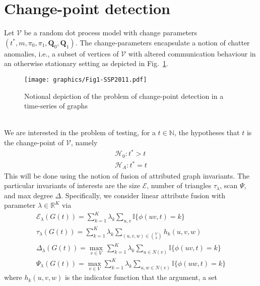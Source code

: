 \documentclass[draftcls]{IEEEtran}
\theoremstyle{definition}
\begin{document}
\section{Change-point detection}
Let $\mathscr{V}$ be a random dot process model with change parameters
$(t^{*}, m, \pi_0, \pi_1, \mathbf{Q}_0, \mathbf{Q}_1)$. The
change-parameters encapsulate a notion of chatter anomalies, i.e., a
subset of vertices of $\mathscr{V}$ with altered communication
behaviour in an otherwise stationary setting as depicted in Fig.~\ref{fig:notional_change_point}. 
\begin{figure}[htbp]
  \centering
  \texttt{[image: graphics/Fig1-SSP2011.pdf]}
  \caption{Notional depiction of the problem of change-point detection in a time-series of graphs}
  \label{fig:notional_change_point}
\end{figure}
\\ \noindent
We are interested in
the problem of testing, for a $t \in \mathbb{N}$, the hypotheses that
$t$ is the change-point of $\mathscr{V}$, namely
\begin{gather*}
  \mathscr{H}_0 \colon t^{*} > t \\
  \mathscr{H}_A \colon t^{*} = t
\end{gather*}
This will be done using the notion of fusion of attributed graph
invariants. The particular invariants of interests are the size
$\mathcal{E}$, number of triangles $\tau_{\lambda}$, scan $\Psi$, and
max degree $\Delta$. Specifically, we consider linear attribute
fusion with parameter $\lambda \in \mathbb{R}^{K}$ via
\begin{gather}
  \label{eq:6}
  \mathcal{E}_{\lambda}(G(t)) = \sum_{k=1}^{K} \lambda_k \sum_{u,v}
  \mathbb{I}\{ \phi(uv,t) = k \} \\
  \tau_\lambda(G(t)) = \sum_{k=1}^{K} \lambda_k \!\! \sum_{(u,v,w) \in
    \binom{V}{3}} h_k(u,v,w) \\
  \Delta_{\lambda}(G(t)) = \max_{v \in V} \, \sum_{k = 1}^{K} \lambda_k
  \sum_{u \in N(v)}{\mathbb{I}\{\phi(uv,t) = k\}} \\
  \label{eq:3}
  \Psi_{\lambda}(G(t)) = \max_{v \in V} \sum_{k = 1}^{K}
  \lambda_k \!\!\sum_{u,w \in N(v)}\!\!\! \mathbb{I}\{\phi(uw,t) = k\} 
  \end{gather}
where $h_k(u,v,w)$ is the indicator function that the argument, a set
\end{document}
